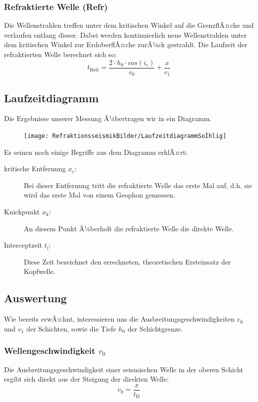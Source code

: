\subsubsection{Refraktierte Welle (Refr)}
Die Wellenstrahlen treffen unter dem kritischen Winkel auf die GrenzflÃ¤che und verlaufen entlang dieser. Dabei werden kontinuierlich neue Wellenstrahlen unter dem kritischen Winkel zur ErdoberflÃ¤che zurÃ¼ck gestrahlt. Die Laufzeit der refraktierten Welle berechnet sich so: \begin{equation*}
	t_{\text{Refr}} = \frac{2 \cdot h_0 \cdot cos(i_c)}{v_0} + \frac{x}{v_1}
\end{equation*}



\subsection{Laufzeitdiagramm}
Die Ergebnisse unserer Messung Ã¼bertragen wir in ein Diagramm. 

\begin{figure}[H]
	\centering
	\texttt{[image: RefraktionsseismikBilder/LaufzeitdiagrammSoÌhlig]}
\end{figure}

Es seinen noch einige Begriffe aus dem Diagramm erklÃ¤rt: \begin{description}
	\item[kritische Entfernung $x_{\text{c}}$:] Bei dieser Entfernung tritt die refraktierte Welle das erste Mal auf, d.h. sie wird das erste Mal von einem Geophon gemessen. 
	\item[Knickpunkt $x_{\text{k}}$:] An diesem Punkt Ã¼berholt die refraktierte Welle die direkte Welle.
	\item[Interceptzeit $t_{\text{i}}$:] Diese Zeit bezeichnet den errechneten, theoretischen Ersteinsatz der Kopfwelle.  
\end{description}

\subsection{Auswertung}
Wie bereits erwÃ¤hnt, interessieren uns die Ausbreitungsgeschwindigkeiten $v_0$ und $v_1$ der Schichten, sowie die Tiefe $h_0$ der Schichtgrenze.

\subsubsection{Wellengeschwindigkeit $v_0$}
Die Ausbreitungsgeschwindigkeit einer seismischen Welle in der oberen Schicht ergibt sich direkt aus der Steigung der direkten Welle: \begin{equation*}
	v_0 = \frac{x}{t_{\text{D}}}
\end{equation*}


